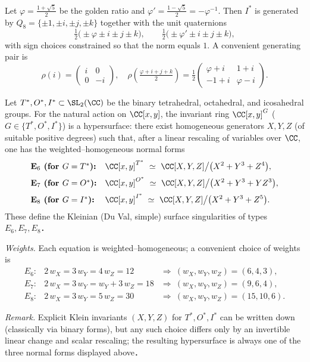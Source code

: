\documentclass[leqno]{ltjsarticle}
\begin{document}
\medskip

Let $\varphi=\tfrac{1+\sqrt{5}}{2}$ be the golden ratio and $\varphi'=\tfrac{1-\sqrt{5}}{2}=-\varphi^{-1}$.  
Then $I^*$ is generated by $Q_8=\{\pm1,\pm i,\pm j,\pm k\}$ together with the unit quaternions
\[
\tfrac{1}{2}\big(\pm \varphi \pm i \pm j \pm k\big),\qquad
\tfrac{1}{2}\big(\pm \varphi' \pm i \pm j \pm k\big),
\]
with sign choices constrained so that the norm equals $1$.  
A convenient generating pair is
\[
\rho(i)=\begin{pmatrix} i&0\\[2pt]0&-i\end{pmatrix},\quad
\rho\!\left(\tfrac{\varphi + i + j + k}{2}\right)
=\tfrac{1}{2}\begin{pmatrix}
\varphi + i & 1+i\\[2pt]
-1+i & \varphi - i
\end{pmatrix}.
\]

Let $T^*,O^*,I^* \subset \SL_2(\CC)$ be the binary tetrahedral, octahedral, and icosahedral groups.
For the natural action on $\CC[x,y]$, the invariant ring $\CC[x,y]^G$ ($G\in\{T^*,O^*,I^*\}$) is a hypersurface:
there exist homogeneous generators $X,Y,Z$ (of suitable positive degrees) such that, after a linear rescaling of variables over $\CC$, one has the weighted–homogeneous normal forms
\[
\begin{array}{ll}
\textbf{E$_6$ (for $G=T^*$):} & \displaystyle \CC[x,y]^{T^*}\ \simeq\ \CC[X,Y,Z]\big/\big(X^2 + Y^3 + Z^4\big), \\[0.6em]
\textbf{E$_7$ (for $G=O^*$):} & \displaystyle \CC[x,y]^{O^*}\ \simeq\ \CC[X,Y,Z]\big/\big(X^2 + Y^3 + YZ^3\big), \\[0.6em]
\textbf{E$_8$ (for $G=I^*$):} & \displaystyle \CC[x,y]^{I^*}\ \simeq\ \CC[X,Y,Z]\big/\big(X^2 + Y^3 + Z^5\big).
\end{array}
\]
These define the Kleinian (Du Val, simple) surface singularities of types $E_6,E_7,E_8$．

\medskip

\noindent\textit{Weights.}
Each equation is weighted–homogeneous; a convenient choice of weights is
\[
\begin{array}{lll}
E_6: & 2\,w_X=3\,w_Y=4\,w_Z=12 & \Rightarrow\ (w_X,w_Y,w_Z)=(6,4,3),\\[0.2em]
E_7: & 2\,w_X=3\,w_Y=w_Y+3\,w_Z=18 & \Rightarrow\ (w_X,w_Y,w_Z)=(9,6,4),\\[0.2em]
E_8: & 2\,w_X=3\,w_Y=5\,w_Z=30 & \Rightarrow\ (w_X,w_Y,w_Z)=(15,10,6).
\end{array}
\]

\medskip

\noindent\textit{Remark.}
Explicit Klein invariants $(X,Y,Z)$ for $T^*,O^*,I^*$ can be written down (classically via binary forms), but any such choice differs only by an invertible linear change and scalar rescaling; the resulting hypersurface is always one of the three normal forms displayed above．
\end{document}
